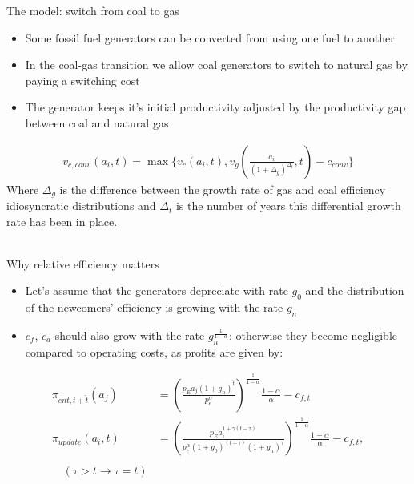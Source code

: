 \documentclass{beamer}
\begin{document}
\begin{frame}{The model: switch from coal to gas}\label{coal_gas}
\footnotesize
\begin{itemize}
    \item Some fossil fuel generators can be converted from using one fuel to another
    \item In the coal-gas transition we allow coal generators to switch to natural gas by paying a switching cost
    \item The generator keeps it's initial productivity adjusted by the productivity gap between coal and natural gas
\end{itemize}
\begin{align*}
    v_{c,conv}(a_i,t) = \max \big\{ v_c(a_i,t), v_g(\frac{a_i}{(1+\Delta_g)^{\Delta_t}},t)-c_{conv}\big\}
\end{align*}
Where $\Delta_g$ is the difference between the growth rate of gas and coal efficiency idiosyncratic distributions and $\Delta_t$ is the number of years this differential growth rate has been in place. \\\\
\hyperlink{gen_problem}{}    
\hyperlink{value_fn}{}    

\end{frame}
\begin{frame}{Why relative efficiency matters}\label{rel_eff_why}
\footnotesize
\small\begin{itemize}
    \item Let's assume that the generators depreciate with rate $g_0$ and the distribution of the newcomers' efficiency is growing with the rate $g_n$
    \item $c_f$, $c_a$ should also grow with the rate $g_n^\frac{1}{1-\alpha}$: otherwise they become negligible compared to operating costs, as profits are given by:\\
\end{itemize}
\begin{align*}
        \pi_{ent,t+\hat{t}}(a_j) &= \left(\frac{p_E a_j\left(1+g_n\right)^\hat{t}}{p_e^\alpha}\right)^{\frac{1}{1-\alpha}} \frac{1-\alpha}{\alpha} - c_{f,t}\\
        \pi_{update}(a_i,t) &= \left(\frac{p_E a_i^{1+\gamma (t-\tau)}}{p_e^\alpha\left(1+g_0\right)^{(t-\tau)}\left(1+g_n\right)^\tau}\right)^{\frac{1}{1-\alpha}} \frac{1-\alpha}{\alpha}-c_{f,t}, \\\\ \quad (\tau>t \rightarrow \tau = t)
    \end{align*}
\end{frame}
\end{document}
